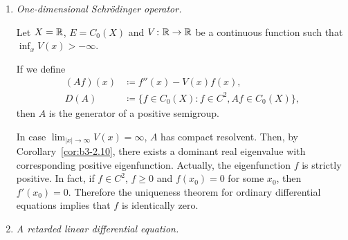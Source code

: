 \begin{example}\label{ex:b3-2.14}
%

\begin{enumerate}[\upshape (i), wide, labelindent=.25em]
	\item \emph{One-dimensional Schrödinger operator.}

	Let $X = \mathbb{R}$, $E = C_{0}(X)$ and $V \colon \mathbb{R} \to \mathbb{R}$ be a continuous function such that $\inf_{x} V(x) > -\infty$.
	
	If we define
	\begin{equation}\label{eq:b3-2.22}
		\begin{aligned}
			(Af)(x) &\coloneq f''(x) - V(x)f(x), \\
			D(A) &\coloneq \{f \in C_{0}(X) \colon f \in C^{2}, Af \in C_{0}(X)\},
		\end{aligned}
	\end{equation}
	then $A$ is the generator of a positive semigroup.
	
	In case $\lim_{|x| \to \infty}V(x) = \infty$, $A$ has compact resolvent.
	Then, by Corollary~\ref{cor:b3-2.10}, there exists a dominant real eigenvalue with corresponding positive eigenfunction.
	Actually, the eigenfunction $f$ is strictly positive. 
    In fact, if\/ $f \in C^{2}$, $f \geq 0$ and $f(x_{0}) = 0$ for some $x_{0}$, then $f'(x_{0}) = 0$.
	Therefore the uniqueness theorem for ordinary differential equations implies that $f$ is identically zero.
	
\item \emph{A retarded linear differential equation.}


\end{enumerate}
\end{example}
